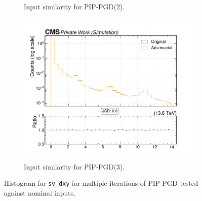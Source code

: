 \begin{figure}[htbp]
\begin{subfigure}[t]{0.32\textwidth}
    \caption*{Input similarity for PIP-PGD(2).}
  \end{subfigure}\hfill
  \begin{subfigure}[t]{0.32\textwidth}
    \includegraphics[width=\linewidth]{media/output/features/compare/combined_it_3/cmp_vtx_arr_sv_dxy.pdf}
    \caption*{Input similarity for PIP-PGD(3).}
  \end{subfigure}

  \caption*{Histogram for \texttt{sv\_dxy} for multiple iterations of PIP-PGD tested against nominal inputs.}
  \label{fig:combined_input_sv_dxy}
\end{figure}

